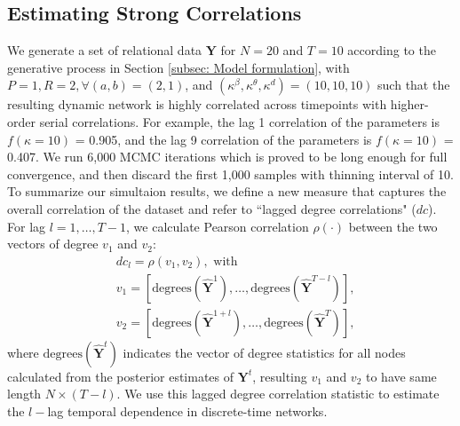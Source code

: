 \documentclass[a4paper]{article}
\begin{document}
\subsection{Estimating Strong Correlations} \label{subsec: correlation}
We generate a set of relational data $\mathbf{Y}$ for $N=20$ and $T=10$ according to the generative process in Section \ref{subsec: Model formulation}, with $P=1, R=2, \forall(a, b) = (2, 1)$, and $(\kappa^\beta, \kappa^\theta, \kappa^d) = (10, 10, 10)$ such that the resulting dynamic network is highly correlated across timepoints with higher-order serial correlations. For example, the lag 1 correlation of the parameters is $f(\kappa = 10)$ = 0.905, and the lag 9 correlation of the parameters is $f(\kappa = 10)$ = 0.407. We run 6,000 MCMC iterations which is proved to be long enough for full convergence, and then discard the first 1,000 samples with thinning interval of 10.\\\newline
To summarize our simultaion results, we define a new measure that captures the overall correlation of the dataset and refer to ``lagged degree correlations" ($dc$). For lag $l=1,\ldots, T-1$, we calculate Pearson correlation $\rho(\cdot)$ between the two vectors of degree $v_1$ and $v_2$:
\begin{equation}
\begin{aligned}
&dc_l = \rho(v_1, v_2), \mbox{ with } \\
&v_1 = [\mbox{degrees}(\hat{\mathbf{Y}}^1), \ldots, \mbox{degrees}(\hat{\mathbf{Y}}^{T-l})],\\
&v_2 = [\mbox{degrees}(\hat{\mathbf{Y}}^{1+l}), \ldots, \mbox{degrees}(\hat{\mathbf{Y}}^{T})],
\end{aligned}
\label{eqn:dc}
	\end{equation}
where $\mbox{degrees}(\hat{\mathbf{Y}}^{t})$ indicates the vector of degree statistics for all nodes calculated from the posterior estimates of  ${\mathbf{Y}}^{t}$, resulting $v_1$ and $v_2$ to have same length $N \times (T-l)$. We use this lagged degree correlation statistic to estimate the $l-$lag temporal dependence in discrete-time networks.  \\ \newline
\end{document}

